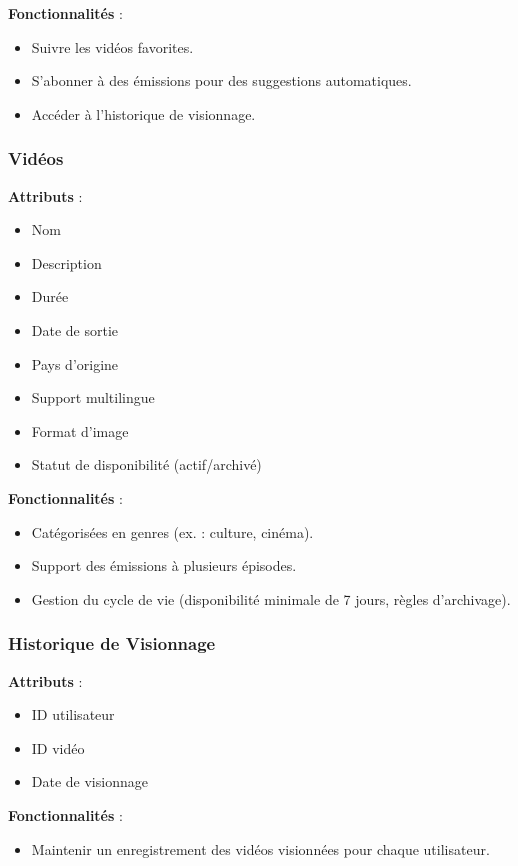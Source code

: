 \documentclass[a4paper,12pt]{article}
\begin{document}
\textbf{Fonctionnalités} :
\begin{itemize}
    \item Suivre les vidéos favorites.
    \item S'abonner à des émissions pour des suggestions automatiques.
    \item Accéder à l'historique de visionnage.
\end{itemize}

\subsubsection{Vidéos}

\textbf{Attributs} :
\begin{itemize}
    \item Nom
    \item Description
    \item Durée
    \item Date de sortie
    \item Pays d'origine
    \item Support multilingue
    \item Format d'image
    \item Statut de disponibilité (actif/archivé)
\end{itemize}

\textbf{Fonctionnalités} :
\begin{itemize}
    \item Catégorisées en genres (ex. : culture, cinéma).
    \item Support des émissions à plusieurs épisodes.
    \item Gestion du cycle de vie (disponibilité minimale de 7 jours, règles d'archivage).
\end{itemize}

\subsubsection{Historique de Visionnage}

\textbf{Attributs} :
\begin{itemize}
    \item ID utilisateur
    \item ID vidéo
    \item Date de visionnage
\end{itemize}

\textbf{Fonctionnalités} :
\begin{itemize}
    \item Maintenir un enregistrement des vidéos visionnées pour chaque utilisateur.
\end{itemize}
\end{document}

